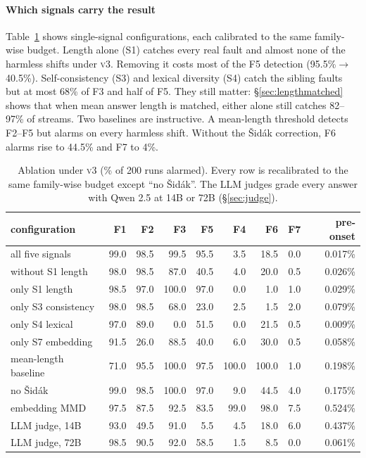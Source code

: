 \documentclass[11pt]{article}
\newcommand{\vthree}{\textsc{v3}}
\begin{document}
\paragraph{Which signals carry the result}
Table~\ref{tab:ablation} shows single-signal configurations, each calibrated to the
same family-wise budget. Length alone (S1) catches every real fault and almost
none of the harmless shifts under \vthree{}. Removing it costs most of the F5
detection (95.5\%$\to$40.5\%). Self-consistency (S3) and lexical diversity (S4)
catch the sibling faults but at most 68\% of F3 and half of F5. They still matter:
\S\ref{sec:lengthmatched} shows that when mean answer length is matched, either
alone still catches 82--97\% of streams. Two baselines are instructive. A mean-length threshold
detects F2--F5 but alarms on every harmless shift. Without the Šidák correction,
F6 alarms rise to 44.5\% and F7 to 4\%.

\begin{table}[t]
  \centering\small
  \caption{Ablation under \vthree{} (\% of 200 runs alarmed). Every row is
  recalibrated to the same family-wise budget except ``no Šidák''. The LLM
  judges grade every answer with Qwen 2.5 at 14B or 72B (\S\ref{sec:judge}).}
  \label{tab:ablation}
  \setlength{\tabcolsep}{4.5pt}
  \begin{tabular}{lrrrr|rrr|r}
    \toprule
    configuration & F1 & F2 & F3 & F5 & F4 & F6 & F7 & pre-onset \\
    \midrule
    all five signals & 99.0 & 98.5 & 99.5 & 95.5 & 3.5 & 18.5 & 0.0 & 0.017\% \\
    without S1 length & 98.0 & 98.5 & 87.0 & 40.5 & 4.0 & 20.0 & 0.5 & 0.026\% \\
    only S1 length & 98.5 & 97.0 & 100.0 & 97.0 & 0.0 & 1.0 & 1.0 & 0.029\% \\
    only S3 consistency & 98.0 & 98.5 & 68.0 & 23.0 & 2.5 & 1.5 & 2.0 & 0.079\% \\
    only S4 lexical & 97.0 & 89.0 & 0.0 & 51.5 & 0.0 & 21.5 & 0.5 & 0.009\% \\
    only S7 embedding & 91.5 & 26.0 & 88.5 & 40.0 & 6.0 & 30.0 & 0.5 & 0.058\% \\
    \midrule
    mean-length baseline & 71.0 & 95.5 & 100.0 & 97.5 & 100.0 & 100.0 & 1.0 & 0.198\% \\
    no Šidák & 99.0 & 98.5 & 100.0 & 97.0 & 9.0 & 44.5 & 4.0 & 0.175\% \\
    embedding MMD & 97.5 & 87.5 & 92.5 & 83.5 & 99.0 & 98.0 & 7.5 & 0.524\% \\
    LLM judge, 14B & 93.0 & 49.5 & 91.0 & 5.5 & 4.5 & 18.0 & 6.0 & 0.437\% \\
    LLM judge, 72B & 98.5 & 90.5 & 92.0 & 58.5 & 1.5 & 8.5 & 0.0 & 0.061\% \\
    \bottomrule
  \end{tabular}
\end{table}
\end{document}
